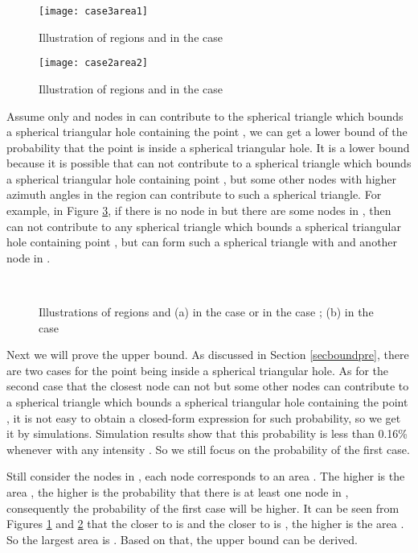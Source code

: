 \documentclass[journal, twoside]{IEEEtran}
\begin{document}
\begin{figure}[ht]
  \centering
  \texttt{[image: case3area1]}
  \caption{Illustration of regions  and  in the case  }
  \label{case3area1}
\end{figure}

\begin{figure}[ht]
  \centering
  \texttt{[image: case2area2]}
  \caption{Illustration of regions  and  in the case  }
  \label{case2area2}
\end{figure}



Assume only  and nodes in  can
contribute to the spherical triangle which bounds a spherical triangular hole containing the
point , we can get a lower bound of the probability that the
point  is inside a spherical triangular hole. It is a lower bound because it is
possible that  can not contribute to a spherical triangle which bounds a spherical  
triangular hole containing point , but some other nodes with 
higher azimuth angles in the region  can contribute to such a spherical triangle.
For example, in Figure \ref{case2area3}, if there is no node in  but 
there are some nodes in , then  can not contribute
to any spherical triangle which bounds a spherical triangular hole containing point , but
 can form such a spherical triangle with  and another node in
.

\begin{figure}[ht]
  \centering {}
  \\
  \caption{Illustrations of regions  and  (a)
  	in the case 
  	or in the case ;
  	(b) in the case  }
  \label{case2area3}
\end{figure}




Next we will prove the upper bound. As discussed in Section \ref{secboundpre},
there are two cases for the point  being inside a spherical triangular hole. As for the 
second case that the closest node  can not but some other nodes
can contribute to a spherical triangle which bounds a spherical triangular hole containing
the point , it is not easy to obtain a closed-form expression for such
probability, so we get it by simulations. Simulation results show
that this probability is less than 0.16\% whenever  with any 
intensity . So we still focus on the probability of the first
case.

Still consider the nodes in , each node  corresponds to 
an area . The higher is the area , 
the higher is the probability that there is at least one node in 
, consequently the probability of the first case
will be higher. It can be seen from Figures \ref{case3area1} and \ref{case2area2} that the closer to 
 is  and the closer to  is , the higher  
is the area  . So the largest area 
 is  .
Based on that, the upper bound can be derived. 
\end{document}
